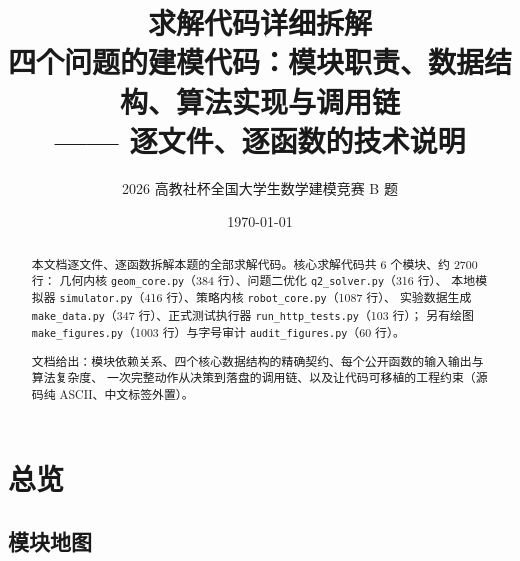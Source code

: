 

\title{\heiti 求解代码详细拆解\\[4pt]
       \large 四个问题的建模代码：模块职责、数据结构、算法实现与调用链\\[2pt]
       \normalsize —— 逐文件、逐函数的技术说明}
\author{2026 高教社杯全国大学生数学建模竞赛 B 题}
\date{\today}


\maketitle
\thispagestyle{fancy}

\begin{abstract}
\noindent
本文档逐文件、逐函数拆解本题的全部求解代码。核心求解代码共 6 个模块、约 2700 行：
几何内核 \texttt{geom\_core.py}（384 行）、问题二优化 \texttt{q2\_solver.py}（316 行）、
本地模拟器 \texttt{simulator.py}（416 行）、策略内核 \texttt{robot\_core.py}（1087 行）、
实验数据生成 \texttt{make\_data.py}（347 行）、正式测试执行器 \texttt{run\_http\_tests.py}（103 行）；
另有绘图 \texttt{make\_figures.py}（1003 行）与字号审计 \texttt{audit\_figures.py}（60 行）。

文档给出：模块依赖关系、四个核心数据结构的精确契约、每个公开函数的输入输出与算法复杂度、
一次完整动作从决策到落盘的调用链、以及让代码可移植的工程约束（源码纯 ASCII、中文标签外置）。
\end{abstract}

\tableofcontents
\newpage

\section{总览}

\subsection{模块地图}

